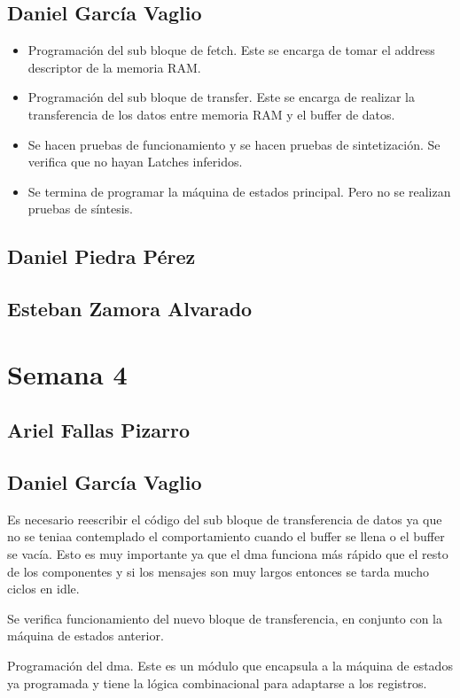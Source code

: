 \subsection{Daniel García Vaglio}
\begin{itemize}
\item Programación del sub bloque de fetch. Este se encarga de tomar el address descriptor de la
  memoria RAM. 
\item Programación del sub bloque de transfer. Este se encarga de realizar la transferencia de los
  datos entre memoria RAM y el buffer de datos. 
\item Se hacen pruebas de funcionamiento y se hacen pruebas de sintetización. Se verifica que no
  hayan Latches inferidos. 
\item Se termina de programar la máquina de estados principal. Pero no se realizan pruebas de
  síntesis.  
\end{itemize}

\subsection{Daniel Piedra Pérez}


\subsection{Esteban Zamora Alvarado}

\newpage

\section{Semana 4}
\subsection{Ariel Fallas Pizarro}


\subsection{Daniel García Vaglio}
\item Es necesario reescribir el código del sub bloque de transferencia de datos ya que no se teniaa
  contemplado el comportamiento cuando el buffer se llena o el buffer se vacía. Esto es muy
  importante ya que el dma funciona más rápido que el resto de los componentes y si los mensajes son
  muy largos entonces se tarda mucho ciclos en idle. 
\item Se verifica funcionamiento del nuevo bloque de transferencia, en conjunto con la máquina de
  estados anterior. 
\item Programación del dma. Este es un módulo que encapsula a la máquina de estados ya programada y
  tiene la lógica combinacional para adaptarse a los registros. 

